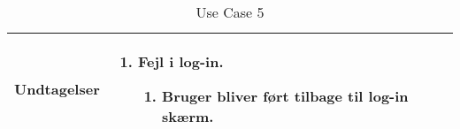\begin{table}[H]
\begin{tabular}{|l|p{10cm}|}
Undtagelser							& 

									\renewcommand{\labelenumi}{\Roman{enumi}:}
									\renewcommand{\labelenumii}{\alph{enumii})}
									\begin{enumerate}[topsep=0.0cm,leftmargin=0.5cm]
										\item Fejl i log-in.
											\begin{enumerate}[topsep=0cm, leftmargin=1cm]
												\item Bruger bliver ført tilbage til log-in skærm.
											\end{enumerate}
									\end{enumerate} \\\hline	

\end{tabular}
\caption{Use Case 5}
\label{tab:UC5}
\end{table}